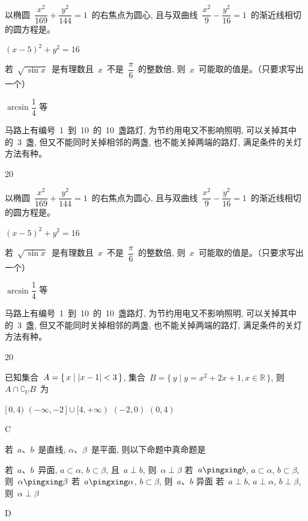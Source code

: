 \documentclass[printbox]{BHCexam}
\begin{document}
\begin{questions}
\question 以椭圆~$\dfrac{x^2}{169}+\dfrac{y^2}{144}=1$~的右焦点为圆心,
    且与双曲线~$\dfrac{x^2}{9}-\dfrac{y^2}{16}=1$~的渐近线相切的圆方程是\tenb。
\begin{solution}
$(x-5)^2+y^2=16$
\end{solution}

\question 若~$\sqrt{\,\sin x}$~是有理数且~$x$~不是~$\dfrac{\pi}{6}$~的整数倍,
    则~$x$~可能取的值是\tenb。（只要求写出一个）
\begin{solution}
$\arcsin\dfrac{1}{4}$ 等
\end{solution}

\question 马路上有编号~1~到~10~的~10~盏路灯, 为节约用电又不影响照明,
    可以关掉其中的~3~盏, 但又不能同时关掉相邻的两盏, 也不能关掉两端的路灯,
    满足条件的关灯方法有\sixb{}种。
\begin{solution}
20
\end{solution}
\question 以椭圆~$\dfrac{x^2}{169}+\dfrac{y^2}{144}=1$~的右焦点为圆心,
    且与双曲线~$\dfrac{x^2}{9}-\dfrac{y^2}{16}=1$~的渐近线相切的圆方程是\tenb。
\begin{solution}
$(x-5)^2+y^2=16$
\end{solution}

\newpage

\question 若~$\sqrt{\,\sin x}$~是有理数且~$x$~不是~$\dfrac{\pi}{6}$~的整数倍,
    则~$x$~可能取的值是\tenb。（只要求写出一个）
\begin{solution}
$\arcsin\dfrac{1}{4}$ 等
\end{solution}

\question 马路上有编号~1~到~10~的~10~盏路灯, 为节约用电又不影响照明,
    可以关掉其中的~3~盏, 但又不能同时关掉相邻的两盏, 也不能关掉两端的路灯,
    满足条件的关灯方法有\sixb{}种。
\begin{solution}
20
\end{solution}
\xuanze
\question 已知集合~$A=\left\{\,x\mid \left|x-1\right|<3\,\right\}$,
集合~$B=\{\,y\mid y=x^2+2x+1,x\in\mathbb{R}\,\}$, 则~$A\cap
\complement_U B$~为
\begin{choices}
\choice $[\,0,4)$
\choice $(-\infty,-2\,]\cup[4,+\infty)$
\choice $(-2,0)$
\choice $(0,4)$
\end{choices}
\begin{solution}
C
\end{solution}

\question 若~$a$、$b$~是直线, $\alpha$、$\beta$~是平面,
则以下命题中真命题是 
\begin{choices}
\choice 若~$a$、$b$~异面, $a\subset\alpha$,
$b\subset\beta$, 且~$a\perp b$, 则~$\alpha\perp\beta$
\choice 若~$a\pingxing b$, $a\subset\alpha$, $b\subset\beta$,
则~$\alpha\pingxing\beta$
\choice 若~$a\pingxing \alpha$,
$b\subset\beta$, 则~$a$、$b$ 异面
\choice 若~$a\perp b$, $a\perp\alpha$,
$b\perp\beta$, 则~$\alpha\perp\beta$
\end{choices}
\begin{solution}
D
\end{solution}


\end{questions}
\end{document}
